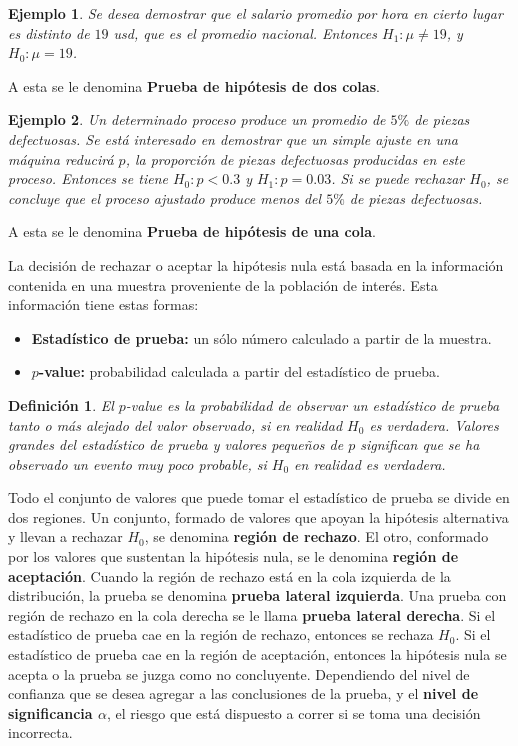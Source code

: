 \documentclass[a4paper]{report} %
\newtheorem{Def}{Definición}[chapter]
\newtheorem{Ejem}{Ejemplo}[chapter]
\begin{document}
\begin{Ejem}
Se desea demostrar que el salario promedio por hora en cierto lugar es distinto de $19$ usd, que es el promedio nacional. Entonces $H_{1}:\mu \neq 19$, y $H_{0}:\mu = 19$.
\end{Ejem}
A esta se le denomina \textbf{Prueba de hipótesis de dos colas}.

\begin{Ejem}
Un determinado proceso produce un promedio de $5\%$ de piezas defectuosas. Se está interesado en demostrar que un simple ajuste en una máquina reducirá $p$, la proporción de piezas defectuosas producidas en este proceso. Entonces se tiene $H_{0}: p < 0.3$ y $H_{1}: p = 0.03$. Si se puede rechazar $H_{0}$, se concluye que el proceso ajustado produce menos del $5\%$ de piezas defectuosas.
\end{Ejem}
A esta se le denomina \textbf{Prueba de hipótesis de una cola}.

La decisión de rechazar o aceptar la hipótesis nula está basada en la información contenida en una muestra proveniente de la población de interés. Esta información tiene estas formas:
\begin{itemize}
    \item \textbf{Estadístico de prueba:} un sólo número calculado a partir de la muestra.
    \item \textbf{$p$-value:} probabilidad calculada a partir del estadístico de prueba.
\end{itemize}

\begin{Def}
El $p$-value es la probabilidad de observar un estadístico de prueba tanto o más alejado del valor observado, si en realidad $H_{0}$ es verdadera. Valores grandes del estadístico de prueba y valores pequeños de $p$ significan que se ha observado un evento muy poco probable, si $H_{0}$ en realidad es verdadera.
\end{Def}

Todo el conjunto de valores que puede tomar el estadístico de prueba se divide en dos regiones. Un conjunto, formado de valores que apoyan la hipótesis alternativa y llevan a rechazar $H_{0}$, se denomina \textbf{región de rechazo}. El otro, conformado por los valores que sustentan la hipótesis nula, se le denomina \textbf{región de aceptación}. Cuando la región de rechazo está en la cola izquierda de la distribución, la prueba se denomina \textbf{prueba lateral izquierda}. Una prueba con región de rechazo en la cola derecha se le llama \textbf{prueba lateral derecha}. Si el estadístico de prueba cae en la región de rechazo, entonces se rechaza $H_{0}$. Si el estadístico de prueba cae en la región de aceptación, entonces la hipótesis nula se acepta o la prueba se juzga como no concluyente. Dependiendo del nivel de confianza que se desea agregar a las conclusiones de la prueba, y el \textbf{nivel de significancia $\alpha$}, el riesgo que está dispuesto a correr si se toma una decisión incorrecta.
\end{document}
